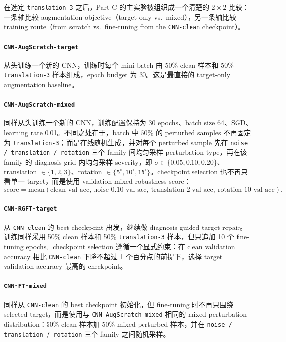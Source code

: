 \documentclass[12pt,a4paper,fontset=fandol]{ctexart}
\begin{document}
在选定 \texttt{translation-3} 之后，Part C 的主实验被组织成一个清楚的 $2 \times 2$ 比较：一条轴比较 augmentation objective（target-only vs.\ mixed），另一条轴比较 training route（from scratch vs.\ fine-tuning from the \texttt{CNN-clean} checkpoint）。

\paragraph{\texttt{CNN-AugScratch-target}}
从头训练一个新的 CNN，训练时每个 mini-batch 由 50\% clean 样本和 50\% \texttt{translation-3} 样本组成，epoch budget 为 30。这是最直接的 target-only augmentation baseline。

\paragraph{\texttt{CNN-AugScratch-mixed}}
同样从头训练一个新的 CNN，训练配置保持为 30 epochs、batch size 64、SGD、learning rate 0.01。不同之处在于，batch 中 50\% 的 perturbed samples 不再固定为 \texttt{translation-3}；而是在线随机生成，并对每个 perturbed sample 先在 \texttt{noise / translation / rotation} 三个 family 间均匀采样 perturbation type，再在该 family 的 diagnosis grid 内均匀采样 severity，即 $\sigma \in \{0.05, 0.10, 0.20\}$、translation $\in \{1,2,3\}$、rotation $\in \{5^\circ, 10^\circ, 15^\circ\}$。checkpoint selection 也不再只看单一 target，而是使用 validation mixed robustness score：
\[
\text{score} = \text{mean}(\text{clean val acc},\ \text{noise-0.10 val acc},\ \text{translation-2 val acc},\ \text{rotation-10 val acc}).
\]

\paragraph{\texttt{CNN-RGFT-target}}
从 \texttt{CNN-clean} 的 best checkpoint 出发，继续做 diagnosis-guided target repair。训练同样采用 50\% clean 样本和 50\% \texttt{translation-3} 样本，但只追加 10 个 fine-tuning epochs。checkpoint selection 遵循一个显式约束：在 clean validation accuracy 相比 \texttt{CNN-clean} 下降不超过 1 个百分点的前提下，选择 target validation accuracy 最高的 checkpoint。

\paragraph{\texttt{CNN-FT-mixed}}
同样从 \texttt{CNN-clean} 的 best checkpoint 初始化，但 fine-tuning 时不再只围绕 selected target，而是使用与 \texttt{CNN-AugScratch-mixed} 相同的 mixed perturbation distribution：50\% clean 样本加 50\% mixed perturbed 样本，并在 \texttt{noise / translation / rotation} 三个 family 之间随机采样。
\end{document}
